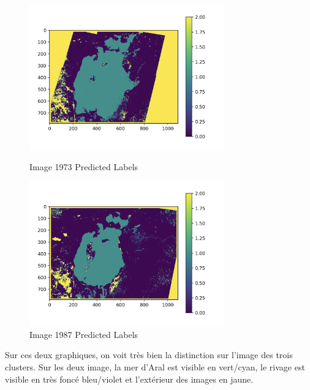 \begin{figure}[!h]
    \begin{minipage}{.48\linewidth}
        \begin{center}
            \includegraphics[width=0.75\textwidth]{./img/6.6.1.png}
                \caption{\label{fig:6.4.1}Image 1973 Predicted Labels}  
            \end{center}
    \end{minipage}\hfill
    \begin{minipage}{.48\linewidth}
        \begin{center}
            \includegraphics[width=0.75\textwidth]{./img/6.6.2.png}
            \caption{\label{fig:6.4.2}Image 1987 Predicted Labels}  
        \end{center}
    \end{minipage}
\end{figure}

\clearpage

Sur ces deux graphiques, on voit très bien la distinction sur l'image des trois clusters. Sur les deux image, la mer d'Aral est 
visible en vert/cyan, le rivage est visible en très foncé bleu/violet et l'extérieur des images en jaune. \\ 

